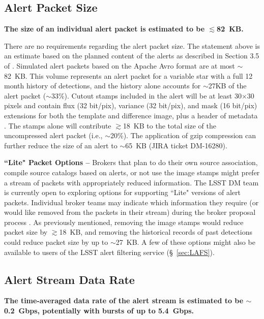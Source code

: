\documentclass[DM,authoryear,toc]{lsstdoc}
\begin{document}
\subsection{Alert Packet Size}\label{ssec:packet_size}

{\bf The size of an individual alert packet is estimated to be $\lesssim$82~KB.}

There are no requirements regarding the alert packet size. The statement above is an estimate based on the planned content of the alerts as described in Section 3.5 of . Simulated alert packets based on the Apache Avro format are at most $\sim$82~KB. This volume represents an alert packet for a variable star with a full 12 month history of detections, and the history alone accounts for $\sim$27KB of the alert packet ($\sim$33\%). Cutout stamps included in the alert will be at least 30$\times$30 pixels and contain \gls{flux} (32 bit/pix), variance (32 bit/pix), and mask (16 bit/pix) extensions for both the template and difference image, plus a header of \gls{metadata} . The stamps alone will contribute $\gtrsim$18~KB to the total size of the uncompressed alert packet (i.e., $\sim$20\%). The application of gzip compression can further reduce the size of an alert to $\sim$65~KB (\gls{JIRA} ticket \gls{DM}-16280).

{\bf ``Lite" Packet Options --} Brokers that plan to do their own source association, compile source catalogs based on alerts, or not use the image stamps might prefer a stream of packets with appropriately reduced information.
The \gls{LSST} \gls{DM} team is currently open to exploring options for supporting ``Lite" versions of alert packets. Individual broker teams may indicate which information they require (or would like removed from the packets in their stream) during the broker proposal process .
As previously mentioned, removing the image stamps would reduce packet size by $\gtrsim$18~KB, and removing the historical records of past detections could reduce packet size by up to $\sim$27~KB.
A few of these options might also be available to users of the \gls{LSST} alert filtering service (\S~\ref{sec:LAFS}).

\subsection{Alert Stream Data Rate}\label{ssec:data_rate}

{\bf The time-averaged data rate of the alert stream is estimated to be $\sim$0.2~Gbps, potentially with bursts of up to 5.4~Gbps.}
\end{document}
